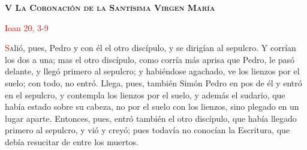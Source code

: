 \begin{center}
    \textbf{\textsc{V La Coronación de la Santísima Virgen María}}
    
    \textcolor{red}{Ioan 20, 3-9}
\end{center}

\vspace{0.25em}

\lettrine[lines=2]{\textcolor{red}{S}}alió, pues, Pedro y con él el otro discípulo, y se dirigían al sepulcro. Y corrían los dos a una; mas el otro
discípulo, como corría más aprisa que Pedro, le pasó delante, y llegó primero al sepulcro; y habiéndose agachado, ve los lienzos por el suelo; con
todo, no entró. Llega, pues, también Simón Pedro en pos de él y entró en el sepulcro, y contempla los lienzos por el suelo, y además el sudario, que 
había estado sobre su cabeza, no por el suelo con los lienzos, sino plegado en un lugar aparte. Entonces, pues, entró también el otro discípulo,
que había llegado primero al sepulcro, y vió y creyó; pues todavía no conocían la Escritura, que debía resucitar de entre los muertos.